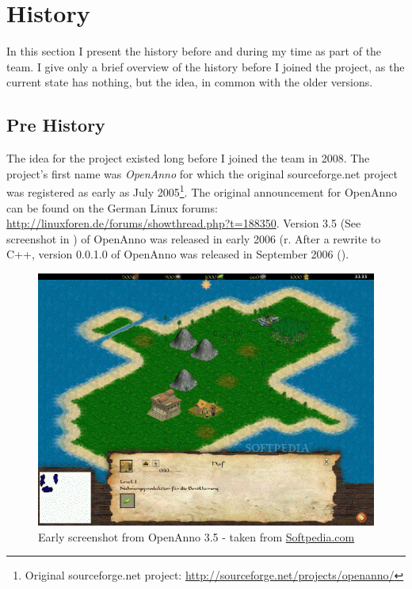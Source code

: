 \section{History}
In this section I present the history before and during my time as part of the \UH{} team. I give only a brief
overview of the history before I joined the project, as the current state has nothing, but the idea, in common with the
older versions.

\subsection{Pre History}
The idea for the \UH{} project existed long before I joined the team in 2008. The project's first name was \textit{OpenAnno}
for which the original sourceforge.net project was registered as early as July 2005\footnote{Original sourceforge.net
project: \url{http://sourceforge.net/projects/openanno/}}. The original announcement for OpenAnno can be found on the
German Linux forums: \url{http://linuxforen.de/forums/showthread.php?t=188350}. Version 3.5 (See screenshot in ) of OpenAnno was released in
early 2006 (\cite{happypenguin}r. After a rewrite to C++,
version 0.0.1.0 of OpenAnno was released in September 2006 (\cite{developia}).

\begin{figure}[!htb]
	\begin{center}
		\includegraphics[scale=0.50]{pics/openannoscreenshot}
	\end{center}
    \caption{Early screenshot from OpenAnno 3.5 - taken from
    \href{http://mac.softpedia.com/progScreenshots/OpenAnno-Screenshot-13550.html}{Softpedia.com}}
    \label{oascreenshot}
\end{figure}

